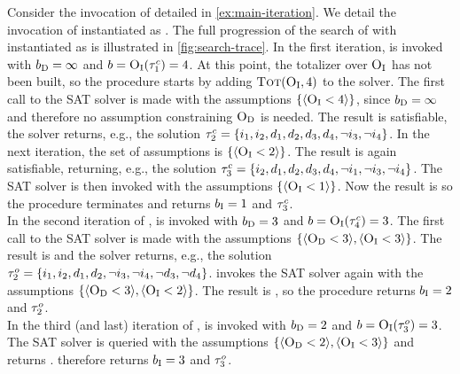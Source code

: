 \begin{example}\label{ex:satunsat}
  Consider the invocation of \algname{} detailed in \cref{ex:main-iteration}. 
  We detail the invocation of \Min{} instantiated as \satunsat{}. 
  The full progression of the search of \algname{} with \Min{} instantiated as \satunsat{} is illustrated in \cref{fig:search-trace}.
  In the first iteration, \satunsat{} is invoked with $b_{\text{D}} = \infty$ and $b=\textsc{O}_{\text{I}}(\tau^c_1) = 4$.
  At this point, the totalizer over $\textsc{O}_{\text{I}}$ has not been built, so the procedure starts by adding $\textsc{Tot}(\textsc{O}_{\text{I}}, 4)$ to the solver.
  The first call to the SAT solver is made with the assumptions $\{\langle \textsc{O}_{\text{I}} < 4 \rangle\}$, since $b_{\text{D}} = \infty$ and therefore no assumption constraining $\textsc{O}_{\text{D}}$ is needed.
  The result is satisfiable, the solver returns, e.g., the solution $\tau^c_2 = \{i_1,\allowbreak i_2,\allowbreak d_1,\allowbreak d_2,\allowbreak d_3,\allowbreak d_4,\allowbreak \lnot i_3,\allowbreak \lnot i_4\}$. 
  In the next iteration, the set of assumptions is $\{\langle \textsc{O}_{\text{I}} < 2 \rangle\}$.
  The result is again satisfiable, returning, e.g., the solution $\tau^c_3 = \{i_2,\allowbreak d_1,\allowbreak d_2,\allowbreak d_3,\allowbreak d_4,\allowbreak \lnot i_1,\allowbreak \lnot i_3,\allowbreak \lnot i_4\}$.
  The SAT solver is then invoked with the assumptions $\{\langle \textsc{O}_{\text{I}} < 1 \rangle\}$.
  Now the result is \unsat{} so the procedure terminates and returns $b_{\text{I}} = 1$ and $\tau^c_3$. \\
  In the second iteration of \algname{}, \satunsat{} is invoked with $b_{\text{D}} = 3$ and $b=\textsc{O}_{\text{I}}(\tau^c_4) = 3$.
  The first call to the SAT solver is made with the assumptions $\{ \langle \textsc{O}_{\text{D}} < 3 \rangle, \langle \textsc{O}_{\text{I}} < 3 \rangle \}$.
  The result is \sat{} and the solver returns, e.g., the solution $\tau^o_2 = \{i_1,\allowbreak i_2,\allowbreak d_1,\allowbreak d_2,\allowbreak \lnot i_3,\allowbreak \lnot i_4,\allowbreak \lnot d_3,\allowbreak \lnot d_4\}$.
  \satunsat{} invokes the SAT solver again with the assumptions $\{ \langle \textsc{O}_{\text{D}} < 3 \rangle, \langle \textsc{O}_{\text{I}} < 2 \rangle \}$.
  The result is \unsat{}, so the procedure returns $b_{\text{I}} = 2$ and $\tau^o_2$. \\
  In the third (and last) iteration of \algname{}, \satunsat{} is invoked with $b_{\text{D}} = 2$ and $b=\textsc{O}_{\text{I}}(\tau^o_3) = 3$.
  The SAT solver is queried with the assumptions $\{ \langle \textsc{O}_{\text{D}} < 2 \rangle, \langle \textsc{O}_{\text{I}} < 3 \rangle \}$ and returns \unsat{}.
  \satunsat{} therefore returns $b_{\text{I}} = 3$ and $\tau^o_3$.
\end{example}

\subsection{\unsatsat{}\label{sec:unsat-sat}}

